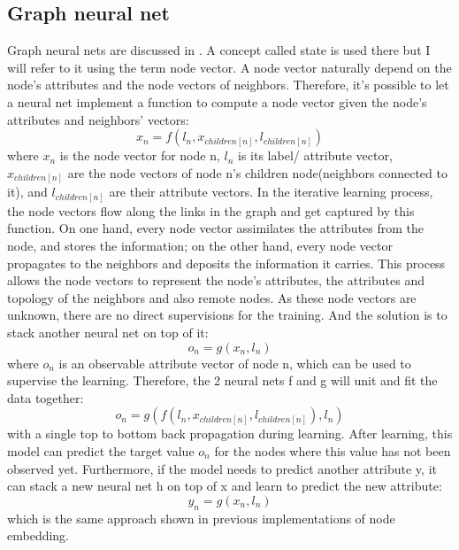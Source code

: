 \documentclass{article}
\begin{document}
\subsection{Graph neural net}
Graph neural nets are discussed in \cite{scarselli2009graph}. A concept called state is used there but I will refer to it using the term node vector. A node vector naturally depend on the node's attributes and the node vectors of neighbors. Therefore, it's possible to let a neural net implement a function to compute a node vector given the node's attributes and neighbors' vectors:
\begin{equation}
	x_n = f(l_n, x_{children[n]}, l_{children[n]})
\end{equation}
where $ x_n $ is the node vector for node n, $ l_n $ is its label/ attribute vector, $ x_{children[n]} $ are the node vectors of node n's children node(neighbors connected to it), and $ l_{children[n]} $ are their attribute vectors. In the iterative learning process, the node vectors flow along the links in the graph and get captured by this function. On one hand, every node vector assimilates the attributes from the node, and stores the information; on the other hand, every node vector propagates to the neighbors and deposits the information it carries. This process allows the node vectors to represent the node's attributes, the attributes and topology of the neighbors and also remote nodes. As these node vectors are unknown, there are no direct supervisions for the training. And the solution is to stack another neural net on top of it:
\begin{equation}
	o_n = g(x_n, l_n)
\end{equation}
where $ o_n $ is an observable attribute vector of node n, which can be used to supervise the learning. Therefore, the 2 neural nets f and g will unit and fit the data together:
\begin{equation}
	o_n = g(f(l_n, x_{children[n]}, l_{children[n]}), l_n)
\end{equation}
with a single top to bottom back propagation during learning. After learning, this model can predict the target value $ o_n $ for the nodes where this value has not been observed yet. Furthermore, if the model needs to predict another attribute y, it can stack a new neural net h on top of x and learn to predict the new attribute:
\begin{equation}
	y_n = g(x_n, l_n)
\end{equation}
which is the same approach shown in previous implementations of node embedding.
\end{document}

